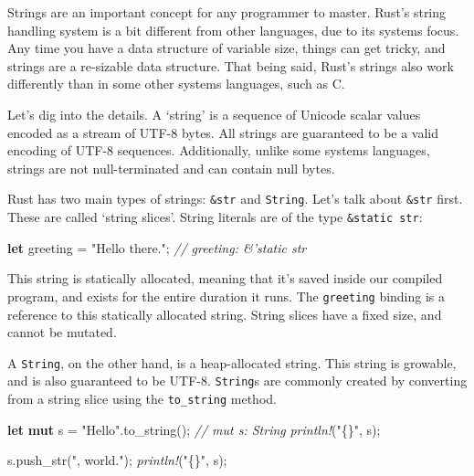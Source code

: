 \documentclass[a4paper,]{book}
\newenvironment{Shaded}{\begin{snugshade}}{\end{snugshade}}
\newcommand{\KeywordTok}[1]{\textcolor[rgb]{0.13,0.29,0.53}{\textbf{{#1}}}}
\newcommand{\StringTok}[1]{\textcolor[rgb]{0.31,0.60,0.02}{{#1}}}
\newcommand{\CommentTok}[1]{\textcolor[rgb]{0.56,0.35,0.01}{\textit{{#1}}}}
\newcommand{\PreprocessorTok}[1]{\textcolor[rgb]{0.56,0.35,0.01}{\textit{{#1}}}}
\newcommand{\NormalTok}[1]{{#1}}
\begin{document}

Strings are an important concept for any programmer to master. Rust's
string handling system is a bit different from other languages, due to
its systems focus. Any time you have a data structure of variable size,
things can get tricky, and strings are a re-sizable data structure. That
being said, Rust's strings also work differently than in some other
systems languages, such as C.

Let's dig into the details. A `string' is a sequence of Unicode scalar
values encoded as a stream of UTF-8 bytes. All strings are guaranteed to
be a valid encoding of UTF-8 sequences. Additionally, unlike some
systems languages, strings are not null-terminated and can contain null
bytes.

Rust has two main types of strings: \texttt{\&str} and \texttt{String}.
Let's talk about \texttt{\&str} first. These are called `string slices'.
String literals are of the type
\texttt{\&\textquotesingle{}static\ str}:

\begin{Shaded}
\begin{Highlighting}[]
\KeywordTok{let} \NormalTok{greeting = }\StringTok{"Hello there."}\NormalTok{; }\CommentTok{// greeting: &'static str}
\end{Highlighting}
\end{Shaded}

This string is statically allocated, meaning that it's saved inside our
compiled program, and exists for the entire duration it runs. The
\texttt{greeting} binding is a reference to this statically allocated
string. String slices have a fixed size, and cannot be mutated.

A \texttt{String}, on the other hand, is a heap-allocated string. This
string is growable, and is also guaranteed to be UTF-8. \texttt{String}s
are commonly created by converting from a string slice using the
\texttt{to\_string} method.

\begin{Shaded}
\begin{Highlighting}[]
\KeywordTok{let} \KeywordTok{mut} \NormalTok{s = }\StringTok{"Hello"}\NormalTok{.to_string(); }\CommentTok{// mut s: String}
\PreprocessorTok{println!}\NormalTok{(}\StringTok{"\{\}"}\NormalTok{, s);}

\NormalTok{s.push_str(}\StringTok{", world."}\NormalTok{);}
\PreprocessorTok{println!}\NormalTok{(}\StringTok{"\{\}"}\NormalTok{, s);}
\end{Highlighting}
\end{Shaded}
\end{document}
